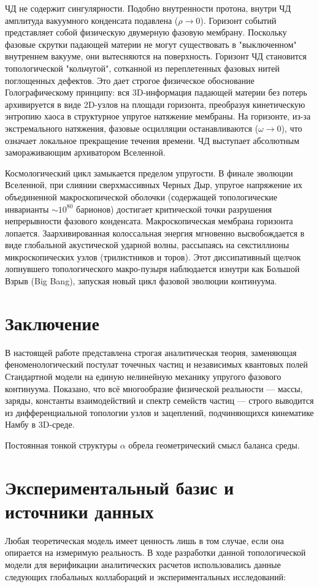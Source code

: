 \documentclass[12pt,a4paper]{article}
\begin{document}
ЧД не содержит сингулярности. Подобно внутренности протона, внутри ЧД амплитуда вакуумного конденсата подавлена ($\rho \to 0$). Горизонт событий представляет собой физическую двумерную фазовую мембрану. Поскольку фазовые скрутки падающей материи не могут существовать в "выключенном" внутреннем вакууме, они вытесняются на поверхность. Горизонт ЧД становится топологической "кольчугой", сотканной из переплетенных фазовых нитей поглощенных дефектов. 
Это дает строгое физическое обоснование Голографическому принципу: вся 3D-информация падающей материи без потерь архивируется в виде 2D-узлов на площади горизонта, преобразуя кинетическую энтропию хаоса в структурное упругое натяжение мембраны. На горизонте, из-за экстремального натяжения, фазовые осцилляции останавливаются ($\omega \to 0$), что означает локальное прекращение течения времени. ЧД выступает абсолютным замораживающим архиватором Вселенной.

Космологический цикл замыкается пределом упругости. В финале эволюции Вселенной, при слиянии сверхмассивных Черных Дыр, упругое напряжение их объединенной макроскопической оболочки (содержащей топологические инварианты $\sim 10^{80}$ барионов) достигает критической точки разрушения непрерывности фазового конденсата. Макроскопическая мембрана горизонта лопается. Заархивированная колоссальная энергия мгновенно высвобождается в виде глобальной акустической ударной волны, рассыпаясь на секстиллионы микроскопических узлов (трилистников и торов). Этот диссипативный щелчок лопнувшего топологического макро-пузыря наблюдается изнутри как Большой Взрыв (Big Bang), запуская новый цикл фазовой эволюции континуума.

\section*{Заключение}

В настоящей работе представлена строгая аналитическая теория, заменяющая феноменологический постулат точечных частиц и независимых квантовых полей Стандартной модели на единую нелинейную механику упругого фазового континуума. 
Показано, что всё многообразие физической реальности — массы, заряды, константы взаимодействий и спектр семейств частиц — строго выводится из дифференциальной топологии узлов и зацеплений, подчиняющихся кинематике Намбу в 3D-среде. 

Постоянная тонкой структуры $\alpha$ обрела геометрический смысл баланса среды.

\section*{Экспериментальный базис и источники данных}
Любая теоретическая модель имеет ценность лишь в том случае, если она опирается на измеримую реальность. В ходе разработки данной топологической модели для верификации аналитических расчетов использовались данные следующих глобальных коллабораций и экспериментальных исследований:
\end{document}
